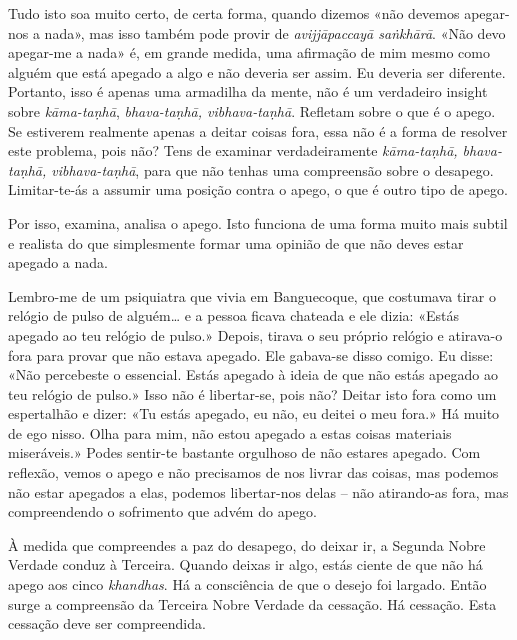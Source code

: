 Tudo isto soa muito certo, de certa forma, quando dizemos «não devemos
apegar-nos a nada», mas isso também pode provir de \emph{avijjāpaccayā saṅkhārā}.
«Não devo apegar-me a nada» é, em grande medida, uma afirmação de
mim mesmo como alguém que está apegado a algo e não deveria ser assim. Eu
deveria ser diferente. Portanto, isso é apenas uma armadilha da mente, não é um
verdadeiro insight sobre \emph{kāma-taṇhā}, \emph{bhava-taṇhā, vibhava-taṇhā}.
Refletam sobre o que é o apego. Se estiverem realmente apenas
a deitar coisas fora, essa não é a forma de resolver este problema, pois não?
Tens de examinar verdadeiramente \emph{kāma-taṇhā, bhava-taṇhā, vibhava-taṇhā},
para que não tenhas uma compreensão sobre o desapego.
Limitar-te-ás a assumir uma posição contra o apego, o que é outro tipo de apego.

Por isso, examina, analisa o apego. Isto funciona de uma forma muito mais subtil
e realista do que simplesmente formar uma opinião de que não deves estar apegado
a nada.

Lembro-me de um psiquiatra que vivia em Banguecoque, que costumava tirar o
relógio de pulso de alguém\ldots{} e a pessoa ficava chateada e ele dizia:
«Estás apegado ao teu relógio de pulso.» Depois, tirava o seu próprio relógio e
atirava-o fora para provar que não estava apegado. Ele gabava-se disso comigo.
Eu disse: «Não percebeste o essencial. Estás apegado à ideia de que não estás
apegado ao teu relógio de pulso.» Isso não é libertar-se, pois não? Deitar isto
fora como um espertalhão e dizer: «Tu estás apegado, eu não, eu deitei o meu
fora.» Há muito de ego nisso. Olha para mim, não estou apegado a estas coisas
materiais miseráveis.» Podes sentir-te bastante orgulhoso de não estares
apegado. Com reflexão, vemos o apego e não precisamos de nos livrar das coisas,
mas podemos não estar apegados a elas, podemos libertar-nos delas -- não
atirando-as fora, mas compreendendo o sofrimento que advém do apego.

À medida que compreendes a paz do desapego, do deixar ir, a Segunda Nobre
Verdade conduz à Terceira. Quando deixas ir algo, estás ciente de que não há
apego aos cinco \emph{khandhas}. Há a consciência de que o desejo foi largado.
Então surge a compreensão da Terceira Nobre Verdade da cessação. Há cessação.
Esta cessação deve ser compreendida.

